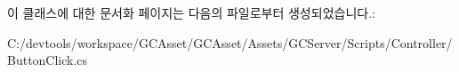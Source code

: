 이 클래스에 대한 문서화 페이지는 다음의 파일로부터 생성되었습니다.\+:\begin{DoxyCompactItemize}
\item 
C\+:/devtools/workspace/\+G\+C\+Asset/\+G\+C\+Asset/\+Assets/\+G\+C\+Server/\+Scripts/\+Controller/Button\+Click.\+cs\end{DoxyCompactItemize}
